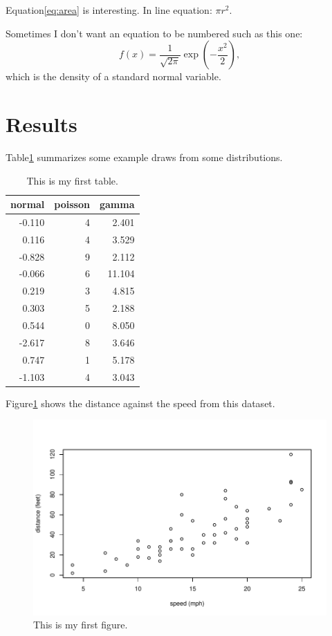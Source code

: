 \documentclass[12pt]{article}
\begin{document}
Equation\ref{eq:area} is interesting. In line equation: $\pi r^2$.\lipsum[1]

Sometimes I don't want an equation to be numbered such as this one:
\[
  f(x) = \frac{1}{\sqrt{2\pi}} \exp\left( - \frac{x^2}{2} \right),
\]
which is the density of a standard normal variable.



\section{Results}\label{sec:resu}


Table\ref{tab:rv} summarizes some example draws from some distributions.
\lipsum[1]

\begin{table}[tbp]
  \caption{This is my first table.}\label{tab:rv}
\centering
\begin{tabular}{rrr}
  \toprule
normal & poisson & gamma \\ 
  \midrule
-0.110 & 4 & 2.401 \\ 
  0.116 & 4 & 3.529 \\ 
  -0.828 & 9 & 2.112 \\ 
  -0.066 & 6 & 11.104 \\ 
  0.219 & 3 & 4.815 \\ 
  0.303 & 5 & 2.188 \\ 
  0.544 & 0 & 8.050 \\ 
  -2.617 & 8 & 3.646 \\ 
  0.747 & 1 & 5.178 \\ 
  -1.103 & 4 & 3.043 \\ 
   \bottomrule
\end{tabular}
\end{table}

Figure\ref{fig:cars} shows the distance against the speed from this dataset.
\begin{figure}[tbp]
  \centering
  \includegraphics[width=\textwidth]{cars.pdf}
  \caption{This is my first figure.}\label{fig:cars}
\end{figure}
\end{document}
